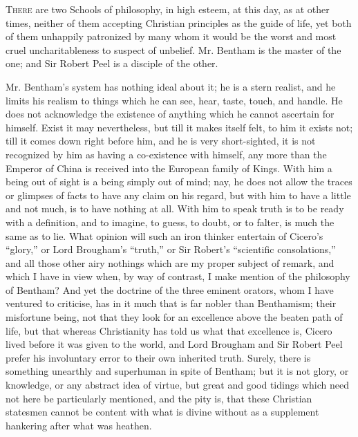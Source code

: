 
T\textsc{here} are two Schools of philosophy, in high esteem, at this
day, as at other times, neither of them accepting Christian principles
as the guide of life, yet both of them unhappily patronized by many
whom it would be the worst and most cruel uncharitableness to suspect
of unbelief. Mr. Bentham is the master of the one; and Sir Robert Peel
is a disciple of the other.

Mr. Bentham's system has nothing ideal about it; he is a stern
realist, and he limits his realism to things which he can see, hear,
taste, touch, and handle. He does not acknowledge the existence of
anything which he cannot ascertain for himself. Exist it may
nevertheless, but till it makes itself felt, to him it exists not;
till it comes down right before him, and he is very short-sighted, it
is not recognized by him as having a co-existence with himself, any
more than the Emperor of China is received into the European family of
Kings. With him a being out of sight is a being simply out of mind;
nay, he does not allow the traces or glimpses of facts to have any
claim on his regard, but with him to have a little and not much, is to
have nothing at all. With him to speak truth is to be ready with a
definition, and to imagine, to guess, to doubt, or to falter, is much
the same as to lie. What opinion will such an iron thinker entertain
of Cicero's ``glory,'' or Lord Brougham's ``truth,''
or Sir Robert's ``scientific consolations,'' and all
those other airy nothings which are my proper subject of remark, and
which I have in view when, by way of contrast, I make mention of the
philosophy of Bentham? And yet the doctrine of the three eminent
orators, whom I have ventured to criticise, has in it much that is far
nobler than Benthamism; their misfortune being, not that they look for
an excellence above the beaten path of life, but that whereas
Christianity has told us what that excellence is, Cicero lived before
it was given to the world, and Lord Brougham and Sir Robert Peel
prefer his involuntary error to their own inherited truth. Surely,
there is something unearthly and superhuman in spite of Bentham; but
it is not glory, or knowledge, or any abstract idea of virtue, but
great and good tidings which need not here be particularly mentioned,
and the pity is, that these Christian statesmen cannot be content with
what is divine without as a supplement hankering after what was
heathen.

